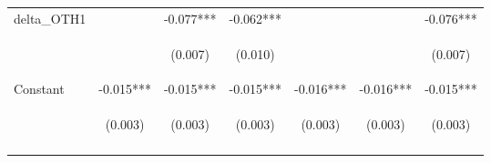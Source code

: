 \begin{center}
\begin{tabular}{lcccccc}
delta\_OTH1 &  & -0.077*** & -0.062*** &  &  & -0.076*** \\
\vspace{4pt} & \begin{footnotesize}\end{footnotesize} & \begin{footnotesize}(0.007)\end{footnotesize} & \begin{footnotesize}(0.010)\end{footnotesize} & \begin{footnotesize}\end{footnotesize} & \begin{footnotesize}\end{footnotesize} & \begin{footnotesize}(0.007)\end{footnotesize} \\
Constant & -0.015*** & -0.015*** & -0.015*** & -0.016*** & -0.016*** & -0.015*** \\
 & \begin{footnotesize}(0.003)\end{footnotesize} & \begin{footnotesize}(0.003)\end{footnotesize} & \begin{footnotesize}(0.003)\end{footnotesize} & \begin{footnotesize}(0.003)\end{footnotesize} & \begin{footnotesize}(0.003)\end{footnotesize} & \begin{footnotesize}(0.003)\end{footnotesize} \\
\vspace{4pt} & \begin{footnotesize}\end{footnotesize} & \begin{footnotesize}\end{footnotesize} & \begin{footnotesize}\end{footnotesize} & \begin{footnotesize}\end{footnotesize} & \begin{footnotesize}\end{footnotesize} & \begin{footnotesize}\end{footnotesize} \\

\end{tabular}
\end{center}
